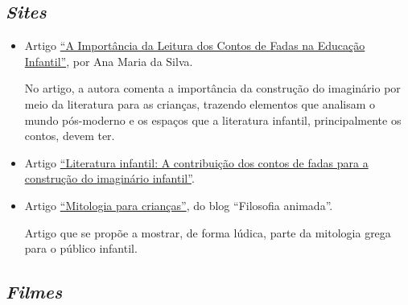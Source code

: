 \documentclass[11pt]{extarticle}
\begin{document}
\subsection{\textit{Sites}}

\begin{itemize}
\item Artigo \href{https://siteantigo.portaleducacao.com.br/conteudo/artigos/educacao/a-importancia-da-leitura-dos-contos-de-fadas-na-educacao-infantil/30151}{``A Importância da Leitura dos Contos de Fadas na Educação Infantil''}, por Ana Maria da Silva.  


No artigo, a autora comenta a importância da construção do imaginário por meio da literatura para as crianças, trazendo elementos que analisam o mundo pós-moderno e os espaços que a literatura infantil, principalmente os contos, devem ter.

\item Artigo \href{http://docs.uninove.br/arte/fac/publicacoes/pdf/v3-n1-2012/Francy.pdf}{``Literatura infantil: A contribuição dos contos de fadas para a construção do imaginário infantil''}.

\item Artigo \href{https://danielmcarlos.wordpress.com/2014/02/09/mitologia-para-criancas/}{``Mitologia para crianças''}, do blog ``Filosofia animada''. 

Artigo que se propõe a mostrar, de forma lúdica, parte da mitologia grega para o público infantil.

\end{itemize}

\subsection{\textit{Filmes}}
\end{document}
